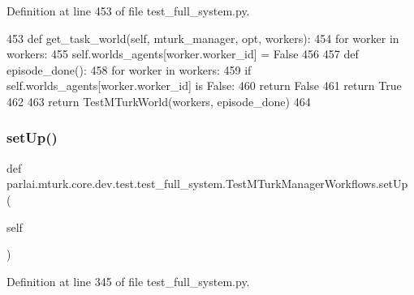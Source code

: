 Definition at line 453 of file test\+\_\+full\+\_\+system.\+py.


\begin{DoxyCode}
453     \textcolor{keyword}{def }get\_task\_world(self, mturk\_manager, opt, workers):
454         \textcolor{keywordflow}{for} worker \textcolor{keywordflow}{in} workers:
455             self.worlds\_agents[worker.worker\_id] = \textcolor{keyword}{False}
456 
457         \textcolor{keyword}{def }episode\_done():
458             \textcolor{keywordflow}{for} worker \textcolor{keywordflow}{in} workers:
459                 \textcolor{keywordflow}{if} self.worlds\_agents[worker.worker\_id] \textcolor{keywordflow}{is} \textcolor{keyword}{False}:
460                     \textcolor{keywordflow}{return} \textcolor{keyword}{False}
461             \textcolor{keywordflow}{return} \textcolor{keyword}{True}
462 
463         \textcolor{keywordflow}{return} TestMTurkWorld(workers, episode\_done)
464 
\end{DoxyCode}
\mbox{\label{classparlai_1_1mturk_1_1core_1_1dev_1_1test_1_1test__full__system_1_1TestMTurkManagerWorkflows_a97ce6f35b55b04c1615325a6f529c991}} 
\subsubsection{\texorpdfstring{set\+Up()}{setUp()}}
{\footnotesize\ttfamily def parlai.\+mturk.\+core.\+dev.\+test.\+test\+\_\+full\+\_\+system.\+Test\+M\+Turk\+Manager\+Workflows.\+set\+Up (\begin{DoxyParamCaption}\item[{}]{self }\end{DoxyParamCaption})}



Definition at line 345 of file test\+\_\+full\+\_\+system.\+py.


